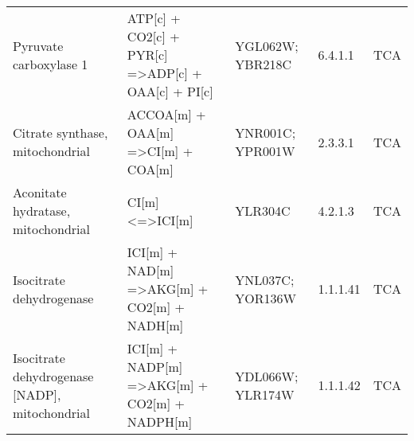 \begin{table}[H]
\begin{center}
{\begin{tabular}{p{11cm}p{17cm}p{8cm}lp{5cm}}
Pyruvate carboxylase 1                                                                    & ATP{[}c{]} + CO2{[}c{]} + PYR{[}c{]} =\textgreater ADP{[}c{]} + OAA{[}c{]} + PI{[}c{]}                                                          & YGL062W; YBR218C                                                                                                                                                 & 6.4.1.1            & TCA                                                                         \\
Citrate synthase, mitochondrial                                                           & ACCOA{[}m{]} + OAA{[}m{]} =\textgreater CI{[}m{]} + COA{[}m{]}                                                                                  & YNR001C; YPR001W                                                                                                                                                 & 2.3.3.1            & TCA                                                                         \\
Aconitate hydratase, mitochondrial                                                        & CI{[}m{]} \textless{}=\textgreater ICI{[}m{]}                                                                                                   & YLR304C                                                                                                                                                          & 4.2.1.3            & TCA                                                                         \\
Isocitrate dehydrogenase                                                                  & ICI{[}m{]} + NAD{[}m{]} =\textgreater AKG{[}m{]} + CO2{[}m{]} + NADH{[}m{]}                                                                     & YNL037C; YOR136W                                                                                                                                                 & 1.1.1.41           & TCA                                                                         \\
Isocitrate dehydrogenase {[}NADP{]}, mitochondrial                                        & ICI{[}m{]} + NADP{[}m{]} =\textgreater AKG{[}m{]} + CO2{[}m{]} + NADPH{[}m{]}                                                                   & YDL066W; YLR174W                                                                                                                                                 & 1.1.1.42           & TCA                                                                         \\

\end{tabular}}
\end{center}
\end{table}
